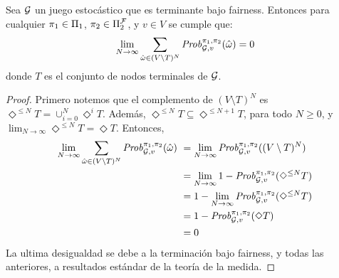 \begin{lemma}\label{lm:sum-of-nonterminal-is-zero}
  Sea $\mathcal{G}$ un juego estocástico que es terminante bajo fairness.
  Entonces para cualquier $\pi_{1} \in \Pi_{1}$,
  $\pi_{2} \in \Pi^{\mathcal{F}}_{2}$, y $v \in V$ se cumple que:
  \[
  \lim_{N \to \infty} \sum_{\hat{\omega} \in (V \setminus T)^N} \mathit{Prob}^{\pi_{1}, \pi_{2}}_{\mathcal{G},v}(\hat{\omega}) = 0
  \]
  donde $T$ es el conjunto de nodos terminales de $\mathcal{G}$.
\end{lemma}
%
\begin{proof}
  Primero notemos que el complemento de $(V \setminus T)^N$ es
  $\Diamond^{\leq N} T = \cup^N_{i=0} \Diamond^i T$.
  Además, $\Diamond^{\leq N} T \subseteq \Diamond^{\leq N+1} T$, para todo $N\geq 0$,
  y $\lim_{N \to \infty} \Diamond^{\leq N} T = \Diamond T$.
  Entonces,
  \begin{align*}
    \lim_{N \to \infty} \sum_{\hat{\omega} \in (V \setminus T)^N} \mathit{Prob}^{\pi_{1}, \pi_{2}}_{\mathcal{G},v}(\hat{\omega}) \
    & = \lim_{N \to \infty} \mathit{Prob}^{\pi_{1}, \pi_{2}}_{\mathcal{G},v}((V \setminus T)^N) \\
    & = \lim_{N \to \infty} 1 - \mathit{Prob}^{\pi_{1}, \pi_{2}}_{\mathcal{G},v}(\Diamond^{\leq N} T ) \\
    & = 1 - \lim_{N \to \infty} \mathit{Prob}^{\pi_{1}, \pi_{2}}_{\mathcal{G},v}(\Diamond^{\leq N} T ) \\
    & = 1 - \mathit{Prob}^{\pi_{1}, \pi_{2}}_{\mathcal{G},v}(\Diamond T ) \\
    & = 0
  \end{align*}
  La ultima desigualdad se debe a la terminación bajo fairness, y todas las anteriores, a resultados estándar de la teoría de la medida.

\end{proof}

